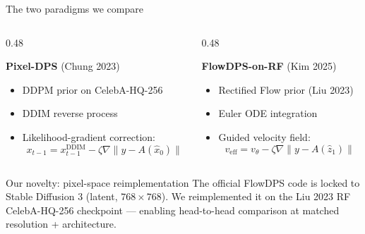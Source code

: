 \documentclass[10pt,aspectratio=169]{beamer}
\begin{document}
\begin{frame}{The two paradigms we compare}
  \begin{columns}[T]
    \begin{column}{0.48\linewidth}
      \begin{block}{\textbf{Pixel-DPS} (Chung 2023)}
        \begin{itemize}
          \item DDPM prior on CelebA-HQ-256
          \item DDIM reverse process
          \item Likelihood-gradient correction:
          \[
            x_{t-1}{=}x_{t-1}^{\mathrm{DDIM}} - \zeta \nabla \|y{-}A(\hat x_0)\|
          \]
        \end{itemize}
      \end{block}
    \end{column}
    \begin{column}{0.48\linewidth}
      \begin{block}{\textbf{FlowDPS-on-RF} (Kim 2025)}
        \begin{itemize}
          \item Rectified Flow prior (Liu 2023)
          \item Euler ODE integration
          \item Guided velocity field:
          \[
            v_{\mathrm{eff}}{=}v_\theta - \zeta \nabla \|y{-}A(\hat z_1)\|
          \]
        \end{itemize}
      \end{block}
    \end{column}
  \end{columns}

  \vspace{0.5em}
  \begin{alertblock}{Our novelty: pixel-space reimplementation}
    The official FlowDPS code is locked to Stable Diffusion 3 (latent,
    $768{\times}768$). We reimplemented it on the Liu 2023 RF
    CelebA-HQ-256 checkpoint --- enabling head-to-head comparison at
    matched resolution + architecture.
  \end{alertblock}

\end{frame}
\end{document}

